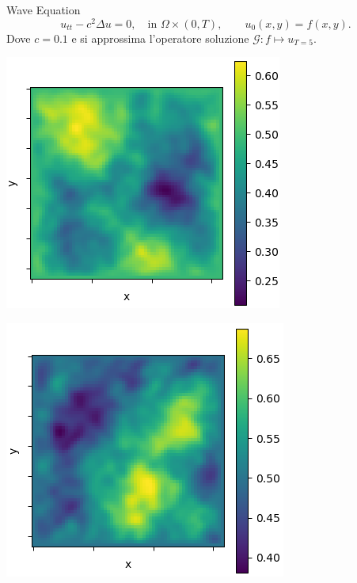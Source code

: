 \documentclass[aspectratio=169]{beamer}
\begin{document}
\begin{frame}[t]{Wave Equation}
    \[
        u_{tt} -c^{2}\Delta u = 0, \quad \text{in } \Omega \times (0, T), \quad\quad u_{0}(x, y) = f(x, y).
    \]
    Dove $c = 0.1$ e si approssima l'operatore soluzione $\mathcal{G}: f\mapsto u_{T=5}$.
    \begin{center}
        \begin{minipage}{0.24\textwidth}
            \includegraphics[width=\textwidth]{operators/wave/input.png}
        \end{minipage}
        \hfill
        \begin{minipage}{0.24\textwidth}
            \includegraphics[width=\textwidth]{operators/wave/output.png}

\end{minipage}
\end{center}
\end{frame}
\end{document}
